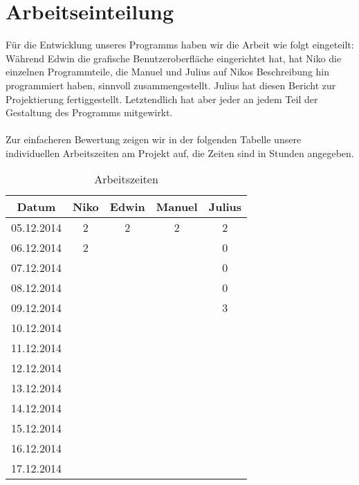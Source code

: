 \documentclass[a4paper, 11pt, titlepage]{article}
\begin{document}
\section{Arbeitseinteilung}

Für die Entwicklung unseres Programms haben wir die Arbeit wie folgt eingeteilt: Während Edwin die grafische Benutzeroberfläche eingerichtet hat, hat Niko die einzelnen Programmteile, die Manuel und Julius auf Nikos Beschreibung hin programmiert haben, sinnvoll zusammengestellt. Julius hat diesen Bericht zur Projektierung fertiggestellt. Letztendlich hat aber jeder an jedem Teil der Gestaltung des Programms mitgewirkt.\\\\
Zur einfacheren Bewertung zeigen wir in der folgenden Tabelle unsere individuellen Arbeitszeiten am Projekt auf, die Zeiten sind in Stunden angegeben.
\begin{table}[htbp]
\centering
\begin{tabular}{|c||c|c|c|c|}
\hline
Datum & Niko & Edwin & Manuel & Julius \\
\hline
\hline
05.12.2014 & 2 & 2 & 2 & 2 \\
\hline
06.12.2014 & 2 &  &  & 0 \\
\hline
07.12.2014 &  &  &  & 0 \\
\hline
08.12.2014 &  &  &  & 0 \\
\hline
09.12.2014 &  &  &  & 3 \\
\hline
10.12.2014 &  &  &  & \\
\hline
11.12.2014 &  &  &  & \\
\hline
12.12.2014 &  &  &  & \\
\hline
13.12.2014 &  &  &  & \\
\hline
14.12.2014 &  &  &  & \\
\hline
15.12.2014 &  &  &  & \\
\hline
16.12.2014 &  &  &  & \\
\hline
17.12.2014 &  &  &  & \\
\hline
\end{tabular}
\caption{Arbeitszeiten}
\end{table}
\end{document}
